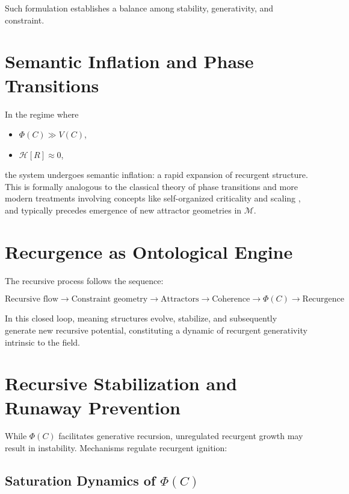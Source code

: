 Such formulation establishes a balance among stability, generativity, and constraint.

\section{Semantic Inflation and Phase Transitions}

In the regime where

\begin{itemize}
    \item \(\Phi(C) \gg V(C)\),
    \item \(\mathcal{H}[R] \approx 0\),
\end{itemize}

the system undergoes semantic inflation: a rapid expansion of recurgent structure. This is formally analogous to the classical theory of phase transitions \autocite{Landau1937} and more modern treatments involving concepts like self-organized criticality and scaling \autocite{BakTangWiesenfeld1987, Cardy1996, Goldenfeld1992}, and typically precedes emergence of new attractor geometries in \(\mathcal{M}\).

\section{Recurgence as Ontological Engine}

The recursive process follows the sequence:

\begin{equation}
\text{Recursive flow} \rightarrow \text{Constraint geometry} \rightarrow \text{Attractors} \rightarrow \text{Coherence} \rightarrow \Phi(C) \rightarrow \text{Recurgence}
\end{equation}

In this closed loop, meaning structures evolve, stabilize, and subsequently generate new recursive potential, constituting a dynamic of recurgent generativity intrinsic to the field.

\section{Recursive Stabilization and Runaway Prevention}

While \(\Phi(C)\) facilitates generative recursion, unregulated recurgent growth may result in instability. Mechanisms regulate recurgent ignition:

\subsection[Saturation Dynamics of Phi(C)]{Saturation Dynamics of \(\Phi(C)\)}


